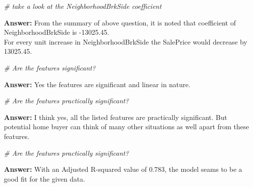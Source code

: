 \documentclass[]{article}
\newenvironment{Shaded}{\begin{snugshade}}{\end{snugshade}}
\newcommand{\CommentTok}[1]{\textcolor[rgb]{0.56,0.35,0.01}{\textit{#1}}}
\begin{document}
\begin{Shaded}
\begin{Highlighting}[]
\CommentTok{# take a look at the NeighborhoodBrkSide coefficient}
\end{Highlighting}
\end{Shaded}

\textbf{Answer:} From the summary of above question, it is noted that
coeﬃcient of NeighborhoodBrkSide is -13025.45.\\
For every unit increase in NeighborhoodBrkSide the SalePrice would
decrease by 13025.45.

\begin{Shaded}
\begin{Highlighting}[]
\CommentTok{# Are the features significant?}
\end{Highlighting}
\end{Shaded}

\textbf{Answer:} Yes the features are significant and linear in nature.

\begin{Shaded}
\begin{Highlighting}[]
\CommentTok{# Are the features practically significant?}
\end{Highlighting}
\end{Shaded}

\textbf{Answer:} I think yes, all the listed features are practically
significant. But potential home buyer can think of many other situations
as well apart from these features.

\begin{Shaded}
\begin{Highlighting}[]
\CommentTok{# Are the features practically significant?}
\end{Highlighting}
\end{Shaded}

\textbf{Answer:} With an Adjusted R-squared value of 0.783, the model
seams to be a good fit for the given data.
\end{document}

